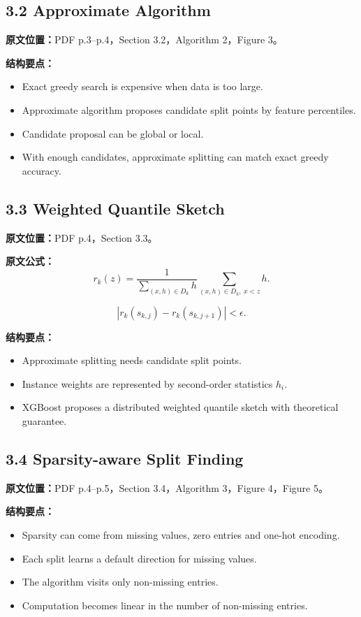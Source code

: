 \subsection{3.2 Approximate Algorithm}

\textbf{原文位置：}PDF p.3--p.4，Section 3.2，Algorithm 2，Figure 3。

\textbf{结构要点：}
\begin{itemize}
  \item Exact greedy search is expensive when data is too large.
  \item Approximate algorithm proposes candidate split points by feature percentiles.
  \item Candidate proposal can be global or local.
  \item With enough candidates, approximate splitting can match exact greedy accuracy.
\end{itemize}

\subsection{3.3 Weighted Quantile Sketch}

\textbf{原文位置：}PDF p.4，Section 3.3。

\textbf{原文公式：}
\[
  r_k(z)
  =
  \frac{1}{\sum_{(x,h)\in D_k}h}
  \sum_{(x,h)\in D_k,\ x<z}h.
\]

\[
  |r_k(s_{k,j})-r_k(s_{k,j+1})|<\epsilon.
\]

\textbf{结构要点：}
\begin{itemize}
  \item Approximate splitting needs candidate split points.
  \item Instance weights are represented by second-order statistics $h_i$.
  \item XGBoost proposes a distributed weighted quantile sketch with theoretical guarantee.
\end{itemize}

\subsection{3.4 Sparsity-aware Split Finding}

\textbf{原文位置：}PDF p.4--p.5，Section 3.4，Algorithm 3，Figure 4，Figure 5。

\textbf{结构要点：}
\begin{itemize}
  \item Sparsity can come from missing values, zero entries and one-hot encoding.
  \item Each split learns a default direction for missing values.
  \item The algorithm visits only non-missing entries.
  \item Computation becomes linear in the number of non-missing entries.
\end{itemize}

